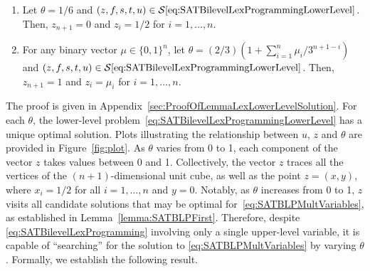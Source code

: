 \documentclass[runningheads,orivec]{llncs}
\newif\ifIPCOFlag
\newcommand{\IPCO}[2]{\ifIPCOFlag#1\else#2\fi}
\newcommand{\MacroColor}[1]{#1}
\newcommand{\NVariables}{\MacroColor{n}}
\newcommand{\OptSolSet}{\MacroColor{\mathcal{S}}}
\newcommand{\ReformZ}{\MacroColor{z}}
\newcommand{\ReformAugFrac}{\MacroColor{f}}
\newcommand{\LexUVar}{\MacroColor{\theta}}
\newcommand{\LexLVarS}{\MacroColor{s}}
\newcommand{\LexLVarT}{\MacroColor{t}}
\newcommand{\LexLVarU}{\MacroColor{u}}
\newcommand{\LexLVarFuncInput}{\MacroColor{\theta}}
\newcommand{\BinaryVector}{\MacroColor{\mu}}
\begin{document}
\begin{lemma}
\begin{enumerate}
\begin{align*}
\begin{cases}
3 \LexLVarFuncInput{}' - 2, & 2/3 \le \LexLVarFuncInput{}' \le 1.
\end{cases}
\end{align*}
\item
\label{lemma:LexLowerLevelSolutionAssertionTwo}
Let $\LexUVar = 1/6$ and $(\ReformZ, \ReformAugFrac, \LexLVarS, \LexLVarT, \LexLVarU) \in \OptSolSet\eqref{eq:SATBilevelLexProgrammingLowerLevel}$.
Then, $\ReformZ_{\NVariables + 1} = 0$ and $\ReformZ_i = 1/2$ for $i = 1, \ldots, \NVariables$.
\item
\label{lemma:LexLowerLevelSolutionAssertionThree}
For any binary vector $\BinaryVector \in \{0, 1\}^{\NVariables}$, let $\LexUVar = (2/3) (1 + \sum_{i = 1}^{\NVariables} \BinaryVector_i/3^{\NVariables + 1 - i})$ and $(\ReformZ, \ReformAugFrac, \LexLVarS, \LexLVarT, \LexLVarU) \in \OptSolSet\eqref{eq:SATBilevelLexProgrammingLowerLevel}$.
Then, $\ReformZ_{\NVariables + 1} = 1$ and $\ReformZ_i = \BinaryVector_i$ for $i = 1, \ldots, \NVariables$.
\end{enumerate}
\end{lemma}
The proof is given in \IPCO{the full version of the paper~\cite{sugishita2025complexitybilevellinearprogramming}}{Appendix~\ref{sec:ProofOfLemmaLexLowerLevelSolution}}.
For each $\LexUVar$, the lower-level problem~\eqref{eq:SATBilevelLexProgrammingLowerLevel} has a unique optimal solution.
Plots illustrating the relationship between $\LexLVarU$, $\ReformZ$ and $\LexUVar$ are provided in Figure~\ref{fig:plot}.
As $\LexUVar$ varies from 0 to 1, each component of the vector $\ReformZ$ takes values between 0 and 1. 
Collectively, the vector $\ReformZ$ traces all the vertices of the $(\NVariables + 1)$-dimensional unit cube, as well as the point $z = (x, y)$, where $x_i = 1/2$ for all $i = 1, \ldots, \NVariables$ and $y = 0$.
Notably, as $\LexUVar$ increases from 0 to 1, $\ReformZ$ visits all candidate solutions that may be optimal for~\eqref{eq:SATBLPMultVariables}, as established in Lemma~\ref{lemma:SATBLPFirst}. 
Therefore, despite \eqref{eq:SATBilevelLexProgramming} involving only a single upper-level variable, it is capable of ``searching'' for the solution to \eqref{eq:SATBLPMultVariables} by varying $\LexUVar$. 
Formally, we establish the following result.
\end{document}
